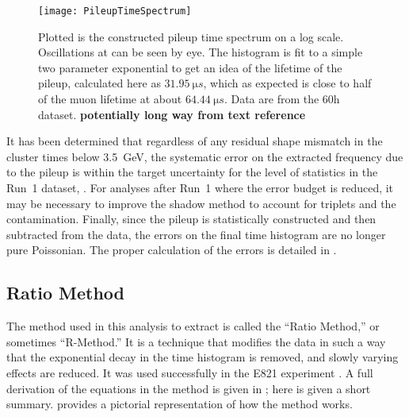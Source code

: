     \begin{figure}
        \centering
        \texttt{[image: PileupTimeSpectrum]}
        \caption[Pileup time spectrum above threshold]{Plotted is the constructed pileup time spectrum on a log scale. Oscillations at \wa can be seen by eye. The histogram is fit to a simple two parameter exponential to get an idea of the lifetime of the pileup, calculated here as $\SI{31.95}{\micro s}$, which as expected is close to half of the muon lifetime at about $\SI{64.44}{\micro s}$. Data are from the 60h dataset. \textbf{potentially long way from text reference}}
        \label{fig:PileupTimeSpectrum}
    \end{figure}





It has been determined that regardless of any residual shape mismatch in the cluster times below \SI{3.5}{\GeV}, the systematic error on the extracted \wa frequency due to the pileup is within the target uncertainty for the level of statistics in the Run~1 dataset, . For analyses after Run~1 where the error budget is reduced, it may be necessary to improve the shadow method to account for triplets and the contamination. Finally, since the pileup is statistically constructed and then subtracted from the data, the errors on the final time histogram are no longer pure Poissonian. The proper calculation of the errors is detailed in .



\clearpage

\subsection{Ratio Method}
\label{sub:ratio_method}


The method used in this analysis to extract \wa is called the ``Ratio Method,'' or sometimes ``R-Method.'' It is a technique that modifies the data in such a way that the exponential decay in the time histogram is removed, and slowly varying effects are reduced. It was used successfully in the E821 experiment \cite{JKThesis,LDThesis,JPThesis}. A full derivation of the equations in the method is given in ; here is given a short summary.  provides a pictorial representation of how the method works.

